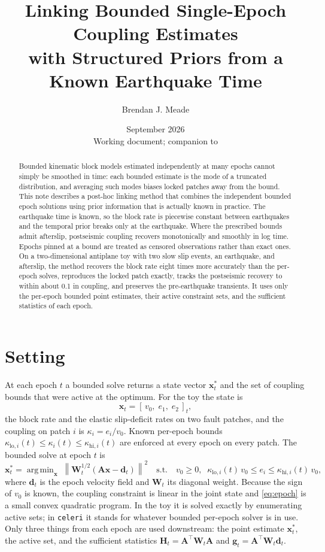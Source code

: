 \documentclass[11pt]{article}
\title{Linking Bounded Single-Epoch Coupling Estimates\\with Structured Priors from a Known Earthquake Time}
\author{Brendan J. Meade}
\date{September 2026 \\[2pt] \small Working document; companion to \code{toy\_method1\_posthoc\_fusion.py}}
\newcommand{\vect}[1]{\bm{#1}}
\newcommand{\mat}[1]{\mathbf{#1}}
\newcommand{\norm}[1]{\left\lVert #1 \right\rVert}
\newcommand{\code}[1]{\texttt{#1}}
\DeclareMathOperator*{\argmin}{arg\,min}
\begin{document}
\maketitle

\begin{abstract}
\noindent
Bounded kinematic block models estimated independently at many epochs cannot simply be smoothed in time: each bounded estimate is the mode of a truncated distribution, and averaging such modes biases locked patches away from the bound. This note describes a post-hoc linking method that combines the independent bounded epoch solutions using prior information that is actually known in practice. The earthquake time is known, so the block rate is piecewise constant between earthquakes and the temporal prior breaks only at the earthquake. Where the prescribed bounds admit afterslip, postseismic coupling recovers monotonically and smoothly in log time. Epochs pinned at a bound are treated as censored observations rather than exact ones. On a two-dimensional antiplane toy with two slow slip events, an earthquake, and afterslip, the method recovers the block rate eight times more accurately than the per-epoch solves, reproduces the locked patch exactly, tracks the postseismic recovery to within about 0.1 in coupling, and preserves the pre-earthquake transients. It uses only the per-epoch bounded point estimates, their active constraint sets, and the sufficient statistics of each epoch.
\end{abstract}

\section{Setting}

At each epoch $t$ a bounded solve returns a state vector $\vect{x}_t^\ast$ and the set of coupling bounds that were active at the optimum. For the toy the state is
\begin{equation}
\vect{x}_t = [\,v_0,\; e_1,\; e_2\,]_t,
\end{equation}
the block rate and the elastic slip-deficit rates on two fault patches, and the coupling on patch $i$ is $\kappa_i = e_i / v_0$. Known per-epoch bounds $\kappa_{\mathrm{lo},i}(t) \le \kappa_i(t) \le \kappa_{\mathrm{hi},i}(t)$ are enforced at every epoch on every patch. The bounded solve at epoch $t$ is
\begin{equation}
\vect{x}_t^\ast = \argmin_{\vect{x}}\; \norm{\mat{W}_t^{1/2}(\mat{A}\vect{x} - \vect{d}_t)}^2
\quad\text{s.t.}\quad v_0 \ge 0,\;\; \kappa_{\mathrm{lo},i}(t)\, v_0 \le e_i \le \kappa_{\mathrm{hi},i}(t)\, v_0,
\label{eq:epoch}
\end{equation}
where $\vect{d}_t$ is the epoch velocity field and $\mat{W}_t$ its diagonal weight. Because the sign of $v_0$ is known, the coupling constraint is linear in the joint state and \eqref{eq:epoch} is a small convex quadratic program. In the toy it is solved exactly by enumerating active sets; in \code{celeri} it stands for whatever bounded per-epoch solver is in use. Only three things from each epoch are used downstream: the point estimate $\vect{x}_t^\ast$, the active set, and the sufficient statistics $\mat{H}_t = \mat{A}^{\!\top}\mat{W}_t\mat{A}$ and $\vect{g}_t = \mat{A}^{\!\top}\mat{W}_t\vect{d}_t$.
\end{document}
